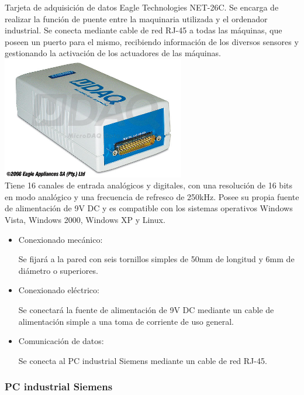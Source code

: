 	
		Tarjeta de adquisición de datos Eagle Technologies NET-26C. Se encarga de realizar la función de puente entre la maquinaria utilizada y el ordenador industrial. Se conecta mediante cable de red RJ-45 a todas las máquinas, que poseen un puerto para el mismo, recibiendo información de los diversos sensores y gestionando la activación de los actuadores de las máquinas.\\
\includegraphics[width=0.6\textwidth]{Datasheets/10Foto.jpg}\\

		Tiene 16 canales de entrada analógicos y digitales, con una resolución de 16 bits en modo analógico y una frecuencia de refresco de 250kHz. Posee su propia fuente de alimentación de 9V DC y es compatible con los sistemas operativos Windows Vista, Windows 2000, Windows XP y Linux.\\

		\begin{itemize}
				\item{Conexionado mecánico:}
				
				Se fijará a la pared con seis tornillos simples de 50mm de longitud y 6mm de diámetro o superiores.

				\item{Conexionado eléctrico:}

				Se conectará la fuente de alimentación de 9V DC mediante un cable de alimentación simple a una toma de corriente de uso general.
				 				
				\item{Comunicación de datos:}
				
				Se conecta al PC industrial Siemens mediante un cable de red RJ-45.

		\end{itemize}

\newpage

	\subsubsection{PC industrial Siemens}


